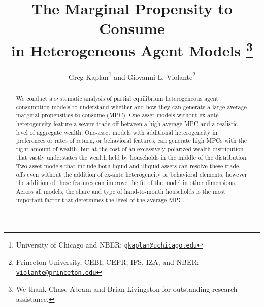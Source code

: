 
%

\newcommand{\plotdir}{/Volumes/FILES/Dropbox/Projects/AnnualReviewsMPC}



\title{\textbf{The Marginal Propensity to Consume \\
\vspace*{.25cm}in Heterogeneous Agent Models} \thanks{
We thank Chase Abram and Brian Livingston for outstanding research
assistance.}}
\bigskip
\bigskip

\author{Greg Kaplan\thanks{University of Chicago and NBER: \href{mailto:gkaplan@uchicago.edu}{\texttt{gkaplan@uchicago.edu}}} 
\hspace*{.2cm} and \hspace{.2cm} 
Giovanni L. Violante\thanks{Princeton University, CEBI, CEPR, IFS, IZA, and NBER: \href{mailto:violante@princeton.edu}{\texttt{violante@princeton.edu}}}}

\bigskip
\maketitle

\begin{abstract}
\begin{singlespace}\noindent
We conduct a systematic analysis of partial equilibrium heterogeneous agent consumption models to understand whether and how they can generate a large average marginal propensities to consume (MPC). One-asset models without ex-ante heterogeneity feature a severe trade-off between a high average MPC and a realistic level of aggregate wealth. One-asset models with additional heterogeneity in preferences or rates of return, or behavioral features, can generate high MPCs with the right amount of wealth, but at the cost of an excessively polarized wealth distribution that vastly understates the wealth held by households in the middle of the distribution. Two-asset models that include both liquid and illiquid assets can resolve these trade-offs even without the addition of ex-ante heterogeneity or behavioral elements, however the addition of these features can improve the fit of the model in other dimensions. Across all models, the share and type of hand-to-mouth households is the most important factor that determines the level of the average MPC.
\end{singlespace}
\end{abstract}

